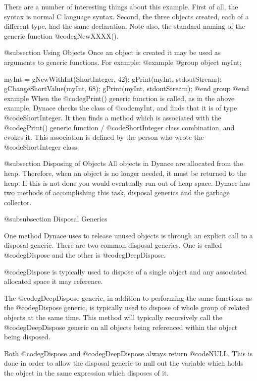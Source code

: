 There are a number of interesting things about this example.  First of
all, the syntax is normal C language syntax.  Second, the three objects
created, each of a different type, had the same declaration.  Note also,
the standard naming of the generic function @code{gNewXXXX()}.

@subsection Using Objects
Once an object is created it may be used as arguments to generic functions.
For example:
@example
@group
        object   myInt;

        myInt = gNewWithInt(ShortInteger, 42);
        gPrint(myInt, stdoutStream);
        gChangeShortValue(myInt, 68);
        gPrint(myInt, stdoutStream);
@end group
@end example
When the @code{gPrint()} generic function is called, as in the above
example, Dynace checks the class of @code{myInt}, and finds that it is of type
@code{ShortInteger}.  It then finds a method which is associated with the
@code{gPrint()} generic function / @code{ShortInteger} class combination,
and evokes it.  This association is defined by the person who wrote the
@code{ShortInteger} class.

@subsection Disposing of Objects
All objects in Dynace are allocated from the heap.  Therefore, when an object
is no longer needed, it must be returned to the heap.  If this is not
done you would eventually run out of heap space.  Dynace has two methods
of accomplishing this task, disposal generics and the garbage collector.

@subsubsection Disposal Generics

One method Dynace uses to release unused objects is through an explicit
call to a disposal generic.  There are two common disposal generics.
One is called @code{gDispose} and the other is @code{gDeepDispose}.

@code{gDispose} is typically used to dispose of a single object and any
associated allocated space it may reference.

The @code{gDeepDispose} generic, in addition to performing the same
functions as the @code{gDispose} generic, is typically used to dispose
of whole group of related objects at the same time.  This method will
typically recursively call the @code{gDeepDispose} generic on all
objects being referenced within the object being disposed.

Both @code{gDispose} and @code{gDeepDispose} always return @code{NULL}.
This is done in order to allow the disposal generic to null out the
variable which holds the object in the same expression which disposes
of it.

